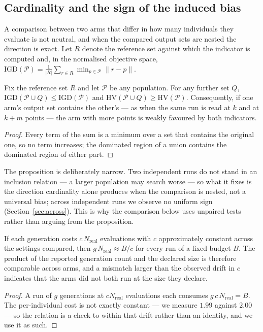 \documentclass{SCIS2026}
\begin{document}
\subsection{Cardinality and the sign of the induced bias}
\label{sec:bias}
A comparison between two arms that differ in how many individuals they evaluate is not neutral, and when the compared output sets are nested the direction is exact. Let $R$ denote the reference set against which the indicator is computed and, in the normalised objective space, $\mathrm{IGD}(\mathcal{P})=\frac{1}{|R|}\sum_{r\in R}\min_{p\in\mathcal{P}}\lVert r-p\rVert$.

\begin{proposition}\label{prop:bias}
Fix the reference set $R$ and let $\mathcal{P}$ be any population. For any further set $Q$, $\mathrm{IGD}(\mathcal{P}\cup Q)\le\mathrm{IGD}(\mathcal{P})$ and $\mathrm{HV}(\mathcal{P}\cup Q)\ge\mathrm{HV}(\mathcal{P})$. Consequently, if one arm's output set contains the other's --- as when the same run is read at $k$ and at $k+m$ points --- the arm with more points is weakly favoured by both indicators.
\end{proposition}
\begin{proof}
Every term of the sum is a minimum over a set that contains the original one, so no term increases; the dominated region of a union contains the dominated region of either part.
\end{proof}

The proposition is deliberately narrow. Two independent runs do not stand in an inclusion relation --- a larger population may search worse --- so what it fixes is the direction cardinality alone produces when the comparison is nested, not a universal bias; across independent runs we observe no uniform sign (Section~\ref{sec:across}). This is why the comparison below uses unpaired tests rather than arguing from the proposition.

\begin{proposition}\label{prop:ident}
If each generation costs $c\,N_{\mathrm{real}}$ evaluations with $c$ approximately constant across the settings compared, then $g\,N_{\mathrm{real}}\approx B/c$ for every run of a fixed budget $B$. The product of the reported generation count and the declared size is therefore comparable across arms, and a mismatch larger than the observed drift in $c$ indicates that the arms did not both run at the size they declare.
\end{proposition}
\begin{proof}
A run of $g$ generations at $cN_{\mathrm{real}}$ evaluations each consumes $g\,c\,N_{\mathrm{real}}=B$. The per-individual cost is not exactly constant --- we measure $1.99$ against $2.00$ --- so the relation is a check to within that drift rather than an identity, and we use it as such.
\end{proof}
\end{document}
